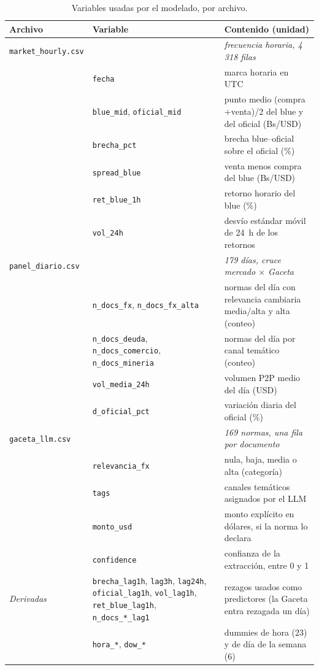 \begin{table}[!ht]
\centering\footnotesize
\begin{tabular}{@{}p{}p{}p{}@{}}
\toprule
Archivo & Variable & Contenido (unidad) \\
\midrule
\texttt{market\_hourly.csv} & & \emph{frecuencia horaria, 4\,318 filas} \\
 & \texttt{fecha} & marca horaria en UTC \\
 & \texttt{blue\_mid}, \texttt{oficial\_mid} & punto medio (compra$+$venta)/2
   del blue y del oficial (Bs/USD) \\
 & \texttt{brecha\_pct} & brecha blue--oficial sobre el oficial (\%) \\
 & \texttt{spread\_blue} & venta menos compra del blue (Bs/USD) \\
 & \texttt{ret\_blue\_1h} & retorno horario del blue (\%) \\
 & \texttt{vol\_24h} & desvío estándar móvil de 24~h de los retornos \\
\midrule
\texttt{panel\_diario.csv} & & \emph{179 días, cruce mercado $\times$ Gaceta} \\
 & \texttt{n\_docs\_fx}, \texttt{n\_docs\_fx\_alta} & normas del día con
   relevancia cambiaria media/alta y alta (conteo) \\
 & \texttt{n\_docs\_deuda}, \texttt{n\_docs\_comercio}, \texttt{n\_docs\_mineria}
   & normas del día por canal temático (conteo) \\
 & \texttt{vol\_media\_24h} & volumen P2P medio del día (USD) \\
 & \texttt{d\_oficial\_pct} & variación diaria del oficial (\%) \\
\midrule
\texttt{gaceta\_llm.csv} & & \emph{169 normas, una fila por documento} \\
 & \texttt{relevancia\_fx} & nula, baja, media o alta (categoría) \\
 & \texttt{tags} & canales temáticos asignados por el LLM \\
 & \texttt{monto\_usd} & monto explícito en dólares, si la norma lo declara \\
 & \texttt{confidence} & confianza de la extracción, entre 0 y 1 \\
\midrule
\emph{Derivadas} & \texttt{brecha\_lag1h}, \texttt{lag3h}, \texttt{lag24h},
   \texttt{oficial\_lag1h}, \texttt{vol\_lag1h}, \texttt{ret\_blue\_lag1h},
   \texttt{n\_docs\_*\_lag1} & rezagos usados como predictores (la Gaceta entra
   rezagada un día) \\
 & \texttt{hora\_*}, \texttt{dow\_*} & dummies de hora (23) y de día de la
   semana (6) \\
\bottomrule
\end{tabular}
\caption{Variables usadas por el modelado, por archivo.}
\label{tab:diccionario}
\end{table}

